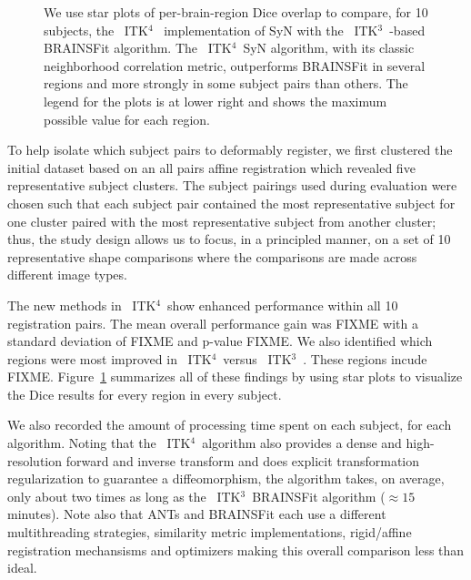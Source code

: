 \documentclass{frontiersSCNS}
\newcommand{\tk}{~ITK$^{\text{4}}$~}
\newcommand{\tkt}{~ITK$^{\text{3}}$~}
\begin{document}
\begin{figure}[t]
\begin{center}
\caption{We use star plots of
  per-brain-region Dice overlap to compare, for 10 subjects, the \tk
  implementation of SyN with the \tkt-based BRAINSFit algorithm.  The
  \tk SyN algorithm, with its classic neighborhood correlation
  metric, outperforms BRAINSFit in several regions and more strongly
  in some subject pairs than others.  The legend for the plots is at
  lower right and shows the maximum possible value for each region.}
\label{fig:antsbfit}
\end{center}
\end{figure}
To help isolate which subject pairs to deformably register, 
we first clustered the initial dataset based on an all pairs
affine registration which revealed five representative subject
clusters.   The subject pairings used during evaluation were chosen 
such that each subject pair contained the most representative subject
for one cluster paired with the most representative subject from
another cluster; thus, the study design allows us to focus, in a
principled manner, on a set of 10 representative shape comparisons
where the comparisons are made across different image types.

The new methods in \tk show enhanced performance 
within all 10 registration pairs.   The mean overall performance gain
was FIXME with a standard deviation of FIXME and p-value FIXME.   We
also identified which regions were most improved in \tk versus \tkt.
These regions incude FIXME.   Figure~\ref{fig:antsbfit} summarizes all
of these findings by using star plots to visualize the Dice results
for every region in every subject.

We also recorded the amount of processing time spent on each subject,
for each algorithm.  Noting that the \tk algorithm also provides a
dense and high-resolution forward and inverse transform and does
explicit transformation regularization to guarantee a diffeomorphism,
the algorithm takes, on average, only about two times as long as the
\tkt BRAINSFit algorithm ($\approx 15$ minutes).  Note also that ANTs
and BRAINSFit each use a different multithreading strategies,
similarity metric implementations, 
rigid/affine registration mechansisms and optimizers making this overall comparison
less than ideal.  
\end{document}
